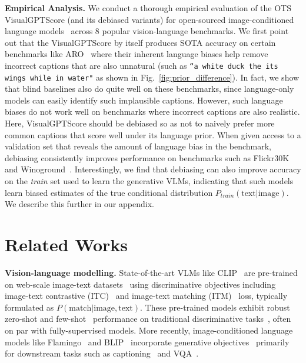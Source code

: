 \documentclass{article} \usepackage{iclr2024_conference,times}
\begin{document}
{\bf Empirical Analysis.} We conduct a thorough empirical evaluation of the OTS VisualGPTScore (and its debiased variants) for open-sourced image-conditioned language models~\citep{blip, blip2} across 8 popular vision-language benchmarks. We first point out that the VisualGPTScore by itself produces SOTA accuracy on certain benchmarks like ARO~\citep{aro} where their inherent language biases help remove incorrect captions that are also unnatural (such as {\tt ``a white duck the its wings while in water"} as shown in Fig.~\ref{fig:prior_difference}). In fact, we show that blind baselines also do quite well on these benchmarks, since language-only models can easily identify such implausible captions. However, such language biases do not work well on benchmarks where incorrect captions are also realistic. Here, VisualGPTScore should be debiased so as not to naively prefer more common captions that score well under its language prior. When given access to a validation set that reveals the amount of language bias in the benchmark, debiasing consistently improves performance on benchmarks such as Flickr30K~\citep{flickr30k} and Winoground~\citep{winoground}. Interestingly, we find that debiasing can also improve accuracy on the {\em train} set used to learn the generative VLMs, indicating that such models learn biased estimates of the true conditional distribution $P_{train}(\text{text}|\text{image})$. We describe this further in our appendix.



























\section{Related Works}


{\bf Vision-language modelling.} State-of-the-art VLMs like CLIP~\citep{clip} are pre-trained on web-scale image-text datasets~\citep{laion400m, laion5b} using discriminative objectives including image-text contrastive (ITC)~\citep{clip, align} and image-text matching (ITM)~\citep{albef, blip} loss, typically formulated as $P(\text{match}|\text{image},\text{text})$. These pre-trained models exhibit robust zero-shot and few-shot~\citep{lin2023multimodality, wortsman2022robust} performance on traditional discriminative tasks~\citep{deng2009imagenet, coco}, often on par with fully-supervised models. More recently, image-conditioned language models like Flamingo~\citep{flamingo} and BLIP~\citep{blip, blip2} incorporate generative objectives~\citep{bengio2003neural} primarily for downstream tasks such as captioning~\citep{nocaps} and VQA~\citep{vqa2}. 
\end{document}

